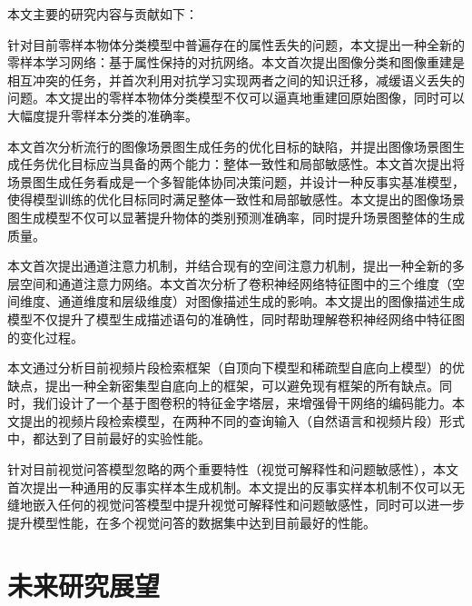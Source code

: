 本文主要的研究内容与贡献如下：
\begin{asparaenum}
\item 针对目前零样本物体分类模型中普遍存在的属性丢失的问题，本文提出一种全新的零样本学习网络：基于属性保持的对抗网络。本文首次提出图像分类和图像重建是相互冲突的任务，并首次利用对抗学习实现两者之间的知识迁移，减缓语义丢失的问题。本文提出的零样本物体分类模型不仅可以逼真地重建回原始图像，同时可以大幅度提升零样本分类的准确率。

\item 本文首次分析流行的图像场景图生成任务的优化目标的缺陷，并提出图像场景图生成任务优化目标应当具备的两个能力：整体一致性和局部敏感性。本文首次提出将场景图生成任务看成是一个多智能体协同决策问题，并设计一种反事实基准模型，使得模型训练的优化目标同时满足整体一致性和局部敏感性。本文提出的图像场景图生成模型不仅可以显著提升物体的类别预测准确率，同时提升场景图整体的生成质量。

\item 本文首次提出通道注意力机制，并结合现有的空间注意力机制，提出一种全新的多层空间和通道注意力网络。本文首次分析了卷积神经网络特征图中的三个维度（空间维度、通道维度和层级维度）对图像描述生成的影响。本文提出的图像描述生成模型不仅提升了模型生成描述语句的准确性，同时帮助理解卷积神经网络中特征图的变化过程。

\item 本文通过分析目前视频片段检索框架（自顶向下模型和稀疏型自底向上模型）的优缺点，提出一种全新密集型自底向上的框架，可以避免现有框架的所有缺点。同时，我们设计了一个基于图卷积的特征金字塔层，来增强骨干网络的编码能力。本文提出的视频片段检索模型，在两种不同的查询输入（自然语言和视频片段）形式中，都达到了目前最好的实验性能。

\item 针对目前视觉问答模型忽略的两个重要特性（视觉可解释性和问题敏感性），本文首次提出一种通用的反事实样本生成机制。本文提出的反事实样本机制不仅可以无缝地嵌入任何的视觉问答模型中提升视觉可解释性和问题敏感性，同时可以进一步提升模型性能，在多个视觉问答的数据集中达到目前最好的性能。

\end{asparaenum}

\section{未来研究展望}

